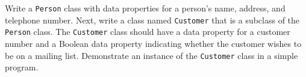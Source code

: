 Write a \texttt{Person} class with data properties for a person's name, address, and telephone number. Next, write a class named \texttt{Customer} that is a subclass of the \texttt{Person} class. The \texttt{Customer} class should have a data property for a customer number and a Boolean data property indicating whether the customer wishes to be on a mailing list. Demonstrate an instance of the \texttt{Customer} class in a simple program.
